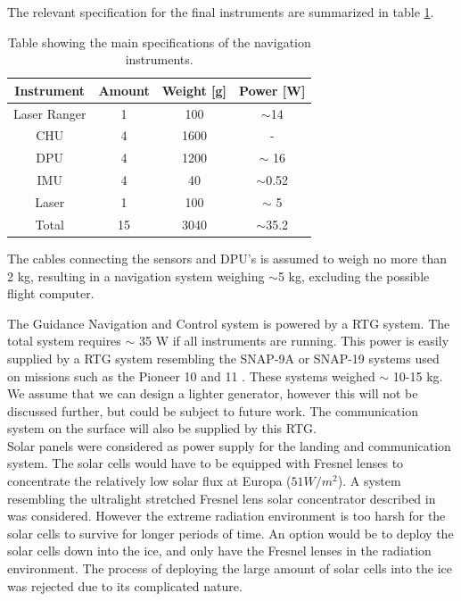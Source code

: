 The relevant specification for the final instruments are summarized in table \ref{tab:navinst}.

\begin{table}
\begin{center}
\begin{tabular}{|c|c|c|c|}
\hline
Instrument & Amount & Weight [g] & Power [W]\\
\hline
Laser Ranger & 1 & 100 & $\sim$14 \\
\hline
CHU & 4 & 1600 & - \\
\hline
DPU & 4 & 1200 &$\sim$ 16 \\
\hline
IMU & 4 & 40 & $\sim$0.52 \\
\hline
Laser & 1 & 100 & $\sim$ 5 \\
\hline
Total & 15 & 3040 & $\sim$35.2\\
\hline

\end{tabular}
\caption{Table showing the main specifications of the navigation instruments.}
\label{tab:navinst}
\end{center}
\end{table} 

The cables connecting the sensors and DPU's is assumed to weigh no more than 2 kg, resulting in a navigation system weighing $\sim$5 kg, excluding the possible flight computer. 

 

The Guidance Navigation and Control system is powered by a RTG system. The total system requires $\sim$ 35 W if all instruments are running. This power is easily supplied by a RTG system resembling the SNAP-9A or SNAP-19 systems used on missions such as the Pioneer 10 and 11 \cite{wikirtg}. These systems weighed $\sim$ 10-15 kg. We assume that we can design a lighter generator, however this will not be discussed further, but could be subject to future work. The communication system on the surface will also be supplied by this RTG. \\

Solar panels were considered as power supply for the landing and communication system. The solar cells would have to be equipped with Fresnel lenses to concentrate the relatively low solar flux at Europa ($51 W/m^2$). A system resembling the ultralight stretched Fresnel lens solar concentrator described in \cite{fresnel} was considered. However the extreme radiation environment is too harsh for the solar cells to survive for longer periods of time. An option would be to deploy the solar cells down into the ice, and only have the Fresnel lenses in the radiation environment. The process of deploying the large amount of solar cells into the ice was rejected due to its complicated nature. 




